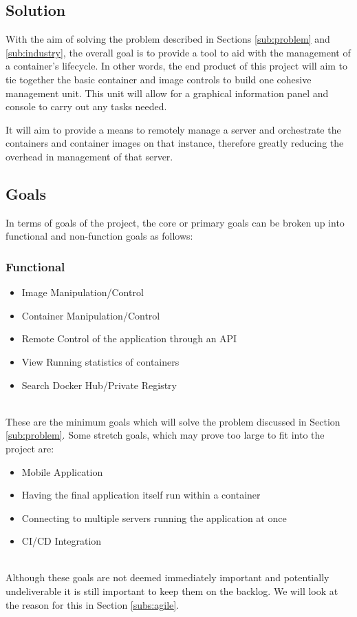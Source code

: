 \subsection{Solution}
With the aim of solving the problem described in Sections \ref{sub:problem} and \ref{sub:industry}, the overall goal is to provide a tool to aid with the management of a container's lifecycle. In other words, the end product of this project will aim to tie together the basic container and image controls to build one cohesive management unit. This unit will allow for a graphical information panel and console to carry out any tasks needed.

It will aim to provide a means to remotely manage a server and orchestrate the containers and container images on that instance, therefore greatly reducing the overhead in management of that server.

\subsection{Goals}
In terms of goals of the project, the core or primary goals can be broken up into functional and non-function goals as follows:

\subsubsection{Functional}

\begin{itemize}
  \item Image Manipulation/Control
  \item Container Manipulation/Control
  \item Remote Control of the application through an API
  \item View Running statistics of containers
  \item Search Docker Hub/Private Registry 
\end{itemize}
\mbox{}\\
These are the minimum goals which will solve the problem discussed in Section \ref{sub:problem}. Some stretch goals, which may prove too large to fit into the project are:
\mbox{}\\
\begin{itemize}
  \item Mobile Application
  \item Having the final application itself run within a container
  \item Connecting to multiple servers running the application at once
  \item CI/CD Integration
\end{itemize}
\mbox{}\\
Although these goals are not deemed immediately important and potentially undeliverable it is still important to keep them on the backlog. We will look at the reason for this in Section \ref{subs:agile}.

